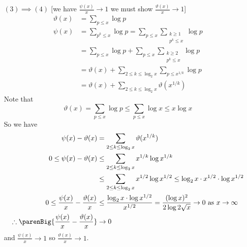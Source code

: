 \textbf{$(3)\implies(4)$} [we have $\frac{\psi(x)}{x}\to1$ we must show $\frac{\vartheta(x)}{x}\to1$] \\
\begin{align*}
\vartheta(x) &= \sum_{p\leq x}\log p \\
\psi(x) &= \sum_{p^k\leq x}\log p = \sum_{p\leq x}\sum_{\substack{k\geq1\\p^k\leq x}}\log p \\
&= \sum_{p\leq x}\log p + \sum_{p\leq x}\sum_{\substack{k\geq2\\p^k\leq x}}\log p \\
&= \vartheta(x) + \sum_{2\leq k\leq\log_2 x}\sum_{p\leq x^{1/k}}\log p \\
&= \vartheta(x) + \sum_{2\leq k\leq\log_2 x}\vartheta(x^{1/k})
\end{align*}
Note that
\[ \vartheta(x) = \sum_{p\leq x}\log p \leq \sum_{p\leq x}\log x \leq x\log x \]
So we have
\begin{align*}
\psi(x)-\vartheta(x) &= \sum_{2\leq k\leq\log_2 x}\vartheta(x^{1/k}) \\
0\leq \psi(x)-\vartheta(x) &\leq \sum_{2\leq k\leq\log_2 x}x^{1/k}\log x^{1/k} \\
&\leq \sum_{2\leq k\leq\log_2 x}x^{1/2}\log x^{1/2} \leq \log_2 x\cdot x^{1/2}\cdot \log x^{1/2} \\
0\leq \frac{\psi(x)}{x}-\frac{\vartheta(x)}{x} &\leq \frac{\log_2 x\cdot\log x^{1/2}}{x^{1/2}} = \frac{(\log x)^2}{2\log 2 \sqrt x} \to 0 \text{ as $x\to\infty$} \\
\therefore\parenBig{\frac{\psi(x)}{x}-\frac{\vartheta(x)}{x}} &\to 0
\end{align*}
and $\frac{\psi(x)}{x}\to1$ so $\frac{\vartheta(x)}{x}\to1$.

